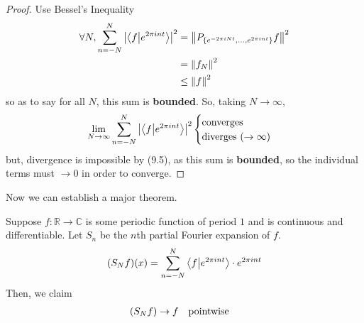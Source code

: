 \begin{proof}
    Use Bessel's Inequality
    \begin{align}
        \forall N, \sum_{n=-N}^N \abs{\braket{f}{e^{2\pi int}}}^2 &= \norm{P_{\{e^{-2\pi iNt}, \dots, e^{2\pi int}\}}f}^2\\
        &= \norm{f_N}^2\\
        &\le \norm{f}^2
    \end{align}
    so as to say for all $N$, this sum is \textbf{bounded}. So, taking $N \to \infty$,
    \begin{align}
        \lim_{N\to\infty} \sum_{n=-N}^N \abs{\braket{f}{e^{2\pi int}}}^2  \begin{cases}
            \text{converges}\\
            \text{diverges ($\to \infty$)}
        \end{cases}
    \end{align}
    but, divergence is impossible by (9.5), as this sum is \textbf{bounded}, so the individual terms must $\to 0$ in order to converge.
\end{proof}
Now we can establish a major theorem.
\begin{theorem}
    Suppose $f: \mathbb{R} \to \mathbb{C}$ is some periodic function of period $1$ and is continuous and differentiable. Let $S_n$ be the $n$th partial Fourier expansion of $f$.
    \begin{align}
        (S_Nf)(x) = \sum_{n=-N}^N \braket{f}{e^{2\pi int}} \cdot e^{2\pi int}
    \end{align}
    Then, we claim
    \begin{align}
        (S_Nf) \to f \qq{pointwise}
    \end{align}
\end{theorem}
